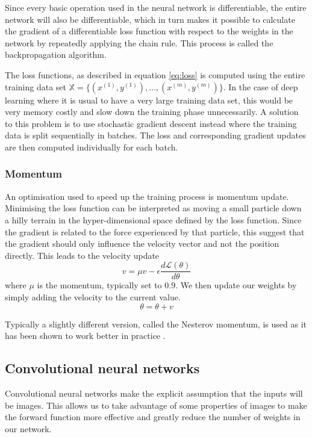 \documentclass[12pt,a4paper,twoside,openright]{report}
\begin{document}
Since every basic operation used in the neural network is differentiable, the entire network will also be differentiable, which in turn makes it possible to calculate the gradient of a differentiable loss function with respect to the weights in the network by repeatedly applying the chain rule. This process is called the backpropagation algorithm.

The loss functions, as described in equation \ref{eq:loss} is computed using the entire training data set $\mathbb{X} = \{(x^{(1)},y^{(1)}), ...,(x^{(m)},y^{(m)})\}$. In the case of deep learning where it is usual to have a very large training data set, this would be very memory costly and slow down the training phase unnecessarily. A solution to this problem is to use stochastic gradient descent instead where the training data is split sequentially in batches. The loss and corresponding gradient updates are then computed individually for each batch.

\subsubsection{Momentum}
An optimisation used to speed up the training process is momentum update. Minimising the loss function can be interpreted as moving a small particle down a hilly terrain in the hyper-dimensional space defined by the loss function. Since the gradient is related to the force experienced by that particle, this suggest that the gradient should only influence the velocity vector and not the position directly. This leads to the velocity update
\begin{equation}
	v = \mu  v - \epsilon \frac{d\mathcal{L}(\theta)}{d\theta}
\end{equation}
where $\mu$ is the momentum, typically set to 0.9. We then update our weights by simply adding the velocity to the current value.
\begin{equation}
	\theta = \theta + v
\end{equation}

Typically a slightly different version, called the Nesterov momentum, is used as it has been shown to work better in practice \cite{nesterov_momentum}.

\subsection{Convolutional neural networks}
Convolutional neural networks make the explicit assumption that the inputs will be images. This allows us to take advantage of some properties of images to make the forward function more effective and greatly reduce the number of weights in our network. 
\end{document}
